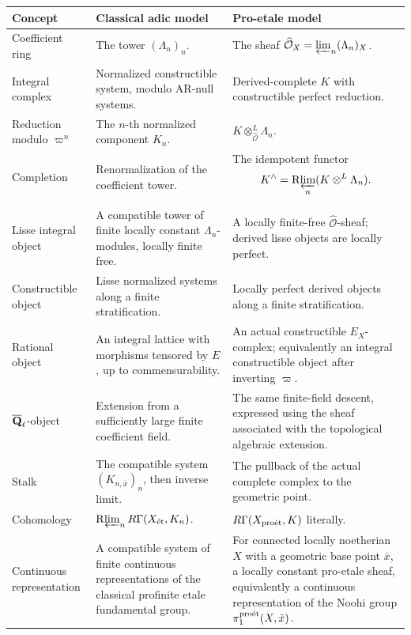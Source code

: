 \begin{longtable}{
 >{\raggedright\arraybackslash}p{}
 >{\raggedright\arraybackslash}p{}
 >{\raggedright\arraybackslash}p{}}
\toprule
Concept & Classical adic model & Pro-etale model\\
\midrule
\endhead
Coefficient ring &
The tower \((\Lambda_n)_n\). &
The sheaf
\(\widehat{\mathcal O}_X=\varprojlim_n(\Lambda_n)_X\).\\

Integral complex &
Normalized constructible system, modulo AR-null systems. &
Derived-complete \(K\) with constructible perfect reduction.\\

Reduction modulo \(\varpi^n\) &
The \(n\)-th normalized component \(K_n\). &
\(K\otimes^L_{\widehat{\mathcal O}}\Lambda_n\).\\

Completion &
Renormalization of the coefficient tower. &
The idempotent functor
\[
 K^\wedge=\mathrm R\!\varprojlim_n(K\otimes^L\Lambda_n).
\]\\

Lisse integral object &
A compatible tower of finite locally constant
\(\Lambda_n\)-modules, locally finite free. &
A locally finite-free
\(\widehat{\mathcal O}\)-sheaf; derived lisse objects are locally perfect.\\

Constructible object &
Lisse normalized systems along a finite stratification. &
Locally perfect derived objects along a finite stratification.\\

Rational object &
An integral lattice with morphisms tensored by \(E\), up to commensurability. &
An actual constructible \(E_X\)-complex; equivalently an integral
constructible object after inverting \(\varpi\).\\

\(\overline{\mathbf Q}_\ell\)-object &
Extension from a sufficiently large finite coefficient field. &
The same finite-field descent, expressed using the sheaf associated with the
topological algebraic extension.\\

Stalk &
The compatible system \((K_{n,\bar x})_n\), then inverse limit. &
The pullback of the actual complete complex to the geometric point.\\

Cohomology &
\(\mathrm R\!\varprojlim_nR\Gamma(X_{\mathrm{\acute et}},K_n)\). &
\(R\Gamma(X_{\mathrm{pro\acute et}},K)\) literally.\\

Continuous representation &
A compatible system of finite continuous representations of the classical
profinite etale fundamental group. &
For connected locally noetherian \(X\) with a geometric base point \(\bar x\),
a locally constant pro-etale sheaf, equivalently a continuous representation
of the Noohi group \(\pi_1^{\mathrm{pro\acute et}}(X,\bar x)\).\\
\bottomrule
\end{longtable}

